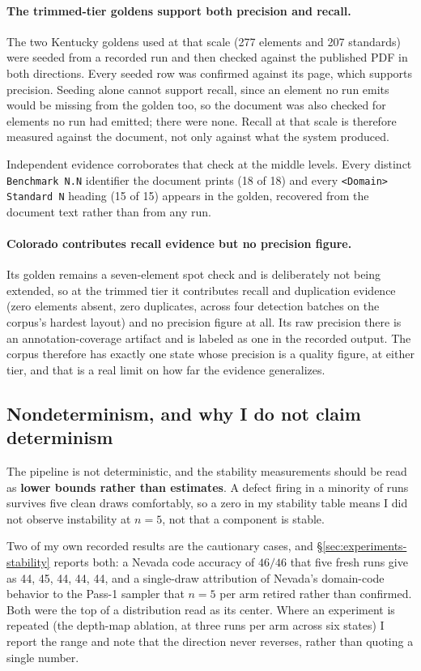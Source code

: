 \paragraph{The trimmed-tier goldens support both precision and recall.} The two
Kentucky goldens used at that scale (277 elements and 207 standards) were seeded
from a recorded run and then checked against the published PDF in both
directions. Every seeded row was confirmed against its page, which supports
precision. Seeding alone cannot support recall, since an element no run emits
would be missing from the golden too, so the document was also checked for
elements no run had emitted; there were none. Recall at that scale is therefore
measured against the document, not only against what the system produced.

Independent evidence corroborates that check at the middle levels. Every
distinct \texttt{Benchmark N.N} identifier the document prints (18 of 18) and
every \texttt{<Domain> Standard N} heading (15 of 15) appears in the golden,
recovered from the document text rather than from any run.

\paragraph{Colorado contributes recall evidence but no precision figure.} Its
golden remains a seven-element spot check and is deliberately not being
extended, so at the trimmed tier it contributes recall and duplication evidence (zero elements absent, zero
duplicates, across four detection batches on the corpus's hardest layout) and
no precision figure at all. Its raw precision there is an annotation-coverage
artifact and is labeled as one in the recorded output. The corpus therefore has
exactly one state whose precision is a quality figure, at either tier, and that
is a real limit on how far the evidence generalizes.

\subsection{Nondeterminism, and why I do not claim determinism}

The pipeline is not deterministic, and the stability measurements should be read
as \textbf{lower bounds rather than estimates}. A defect firing in a minority of
runs survives five clean draws comfortably, so a zero in my stability table
means I did not observe instability at $n{=}5$, not that a component is stable.

Two of my own recorded results are the cautionary cases, and
\S\ref{sec:experiments-stability} reports both: a Nevada code accuracy of
$46/46$ that five fresh runs give as 44, 45, 44, 44, 44, and a single-draw
attribution of Nevada's domain-code behavior to the Pass-1 sampler that $n{=}5$
per arm retired rather than confirmed. Both were the top of a distribution read
as its center. Where an experiment is repeated (the depth-map ablation, at
three runs per arm across six states) I report the range and note that the
direction never reverses, rather than quoting a single number.

